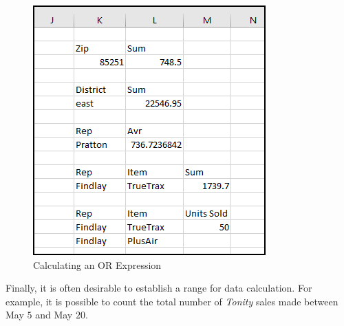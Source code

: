 \begin{figure}[H]
	\centering
	\includegraphics[width=\maxwidth{.65\linewidth}]{gfx/ch09_fig23}
	\caption{Calculating an OR Expression}
	\label{09:fig23}
\end{figure}
	
Finally, it is often desirable to establish a range for data calculation. For example, it is possible to count the total number of \textit{Tonity} sales made between May $ 5 $ and May $ 20 $.

